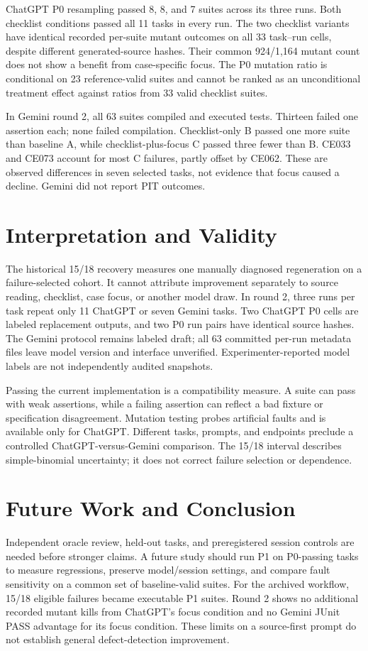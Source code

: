 \documentclass[conference]{IEEEtran}
\begin{document}
ChatGPT P0 resampling passed 8, 8, and 7 suites across its three runs. Both checklist conditions passed all 11 tasks in every run. The two checklist variants have identical recorded per-suite mutant outcomes on all 33 task--run cells, despite different generated-source hashes. Their common 924/1,164 mutant count does not show a benefit from case-specific focus. The P0 mutation ratio is conditional on 23 reference-valid suites and cannot be ranked as an unconditional treatment effect against ratios from 33 valid checklist suites.

In Gemini round 2, all 63 suites compiled and executed tests. Thirteen failed one assertion each; none failed compilation. Checklist-only B passed one more suite than baseline A, while checklist-plus-focus C passed three fewer than B. CE033 and CE073 account for most C failures, partly offset by CE062. These are observed differences in seven selected tasks, not evidence that focus caused a decline. Gemini did not report PIT outcomes.
\section{Interpretation and Validity}
The historical 15/18 recovery measures one manually diagnosed regeneration on a failure-selected cohort. It cannot attribute improvement separately to source reading, checklist, case focus, or another model draw. In round 2, three runs per task repeat only 11 ChatGPT or seven Gemini tasks. Two ChatGPT P0 cells are labeled replacement outputs, and two P0 run pairs have identical source hashes. The Gemini protocol remains labeled draft; all 63 committed per-run metadata files leave model version and interface unverified. Experimenter-reported model labels are not independently audited snapshots.

Passing the current implementation is a compatibility measure. A suite can pass with weak assertions, while a failing assertion can reflect a bad fixture or specification disagreement. Mutation testing probes artificial faults and is available only for ChatGPT. Different tasks, prompts, and endpoints preclude a controlled ChatGPT-versus-Gemini comparison. The 15/18 interval describes simple-binomial uncertainty; it does not correct failure selection or dependence.

\section{Future Work and Conclusion}
Independent oracle review, held-out tasks, and preregistered session controls are needed before stronger claims. A future study should run P1 on P0-passing tasks to measure regressions, preserve model/session settings, and compare fault sensitivity on a common set of baseline-valid suites. For the archived workflow, 15/18 eligible failures became executable P1 suites. Round 2 shows no additional recorded mutant kills from ChatGPT's focus condition and no Gemini JUnit PASS advantage for its focus condition. These limits on a source-first prompt do not establish general defect-detection improvement.
\end{document}
